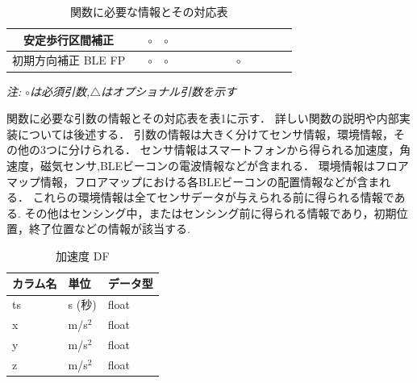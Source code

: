 \begin{table}[ht]
{\begin{tabular}{|c|c|c|c|c|c|c|c|c|c|c|c|c|c|}
			安定歩行区間補正      &                                                        & \multicolumn{1}{c|}{$\circ$} & \multicolumn{1}{c|}{$\circ$} &                              &                              &                              &                                                                                                               &                              &                              &                                  &    &                              &    \\ \hline
			初期方向補正 BLE FP &                                                        & \multicolumn{1}{c|}{$\circ$} & \multicolumn{1}{c|}{$\circ$} &                              &                              &                              &                                                                                                               &                              & \multicolumn{1}{c|}{$\circ$} &                                  &    &                              &    \\ \hline
		\end{tabular}
	}
	\caption{関数に必要な情報とその対応表} \label{}
	\textit{注: $\circ$は必須引数,$\triangle$はオプショナル引数を示す} \label{tab:my_label}
\end{table}


関数に必要な引数の情報とその対応表を表1に示す．
詳しい関数の説明や内部実装については後述する．
引数の情報は大きく分けてセンサ情報，環境情報，その他の3つに分けられる．
センサ情報はスマートフォンから得られる加速度，角速度，磁気センサ,BLEビーコンの電波情報などが含まれる．
環境情報はフロアマップ情報，フロアマップにおける各BLEビーコンの配置情報などが含まれる．
これらの環境情報は全てセンサデータが与えられる前に得られる情報である.
その他はセンシング中，またはセンシング前に得られる情報であり，初期位置，終了位置などの情報が該当する.


\begin{table}[h]
	\centering
	\begin{tabular}{lll}
		\toprule
		カラム名 & 単位        & データ型  \\
		\midrule
		ts   & s (秒)     & float \\
		x    & m/s\(^2\) & float \\
		y    & m/s\(^2\) & float \\
		z    & m/s\(^2\) & float \\
		\bottomrule
	\end{tabular}
	\caption{加速度 DF}
\end{table}

